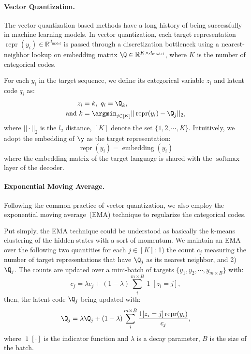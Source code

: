 \paragraph{Vector Quantization.}
The vector quantization based methods have a long history of being successfully in machine learning models. 
In vector quantization, each target representation $\operatorname{repr}(y_i) \in \mathbb{R}^{d_\text{model}}$ is passed through a discretization bottleneck using a nearest-neighbor lookup on embedding matrix $\Q\in \mathbb{R}^{K \times d_\text{model}}$, where $K$ is the number of categorical codes.

For each $y_i$ in the target sequence, we define its categorical variable $z_i$ and latent code $q_i$ as:
\begin{equation}
\begin{split}
    z_i &= k,\ q_i = \Q_k, \\
\text{and}\ k & =\argmin_{j\in [K]} || \operatorname{repr}(y_i) - \Q_j ||_{2},
\end{split}
\label{eqn:vq}
\end{equation}
where $||\cdot||_{2}$ is the ${l}_2$ distance, $[K]$ denote the set $\{1,2,\cdots,K\}$.
Intuitively, we adopt the embedding of $\y$ as the target representation:
\begin{equation*}
    \operatorname{repr}(y_i) = \operatorname{embedding}(y_i)
\end{equation*}
where the embedding matrix of the target language is shared with the $\operatorname{softmax}$ layer of the decoder.

\paragraph{Exponential Moving Average.} 
Following the common practice of vector quantization, we also employ the exponential moving average~(EMA) technique to regularize the categorical codes. 

Put simply, the EMA technique could be understood as basically the k-means clustering of the hidden states with a sort of momentum.  
We maintain an EMA over the following two quantities for each $j \in [K]$: 1) the count $c_j$ measuring the number of target representations that have $\Q_j$ as its nearest neighbor, and 2) $\Q_j$. 
The counts are updated over a mini-batch of targets $\{y_1, y_2,\cdots,y_{m\times B}\}$ with:
\begin{equation}
    c_j  = \lambda c_j + (1-\lambda) \sum_{i}^{m\times B} \operatorname{1}[z_i=j],
    \label{eqn:ema_c}
\end{equation}
then, the latent code $\Q_j$ being updated with:
\begin{equation}
    \Q_j = \lambda \Q_j + (1-\lambda)\sum_{i}^{m\times B}\frac{\operatorname{1}[z_i=j]\operatorname{repr}(y_i)}{c_j},
    \label{eqn:ema_q}
\end{equation}
where $\operatorname{1}[\cdot]$ is the indicator function and $\lambda$ is a decay parameter, $B$ is the size of the batch.


